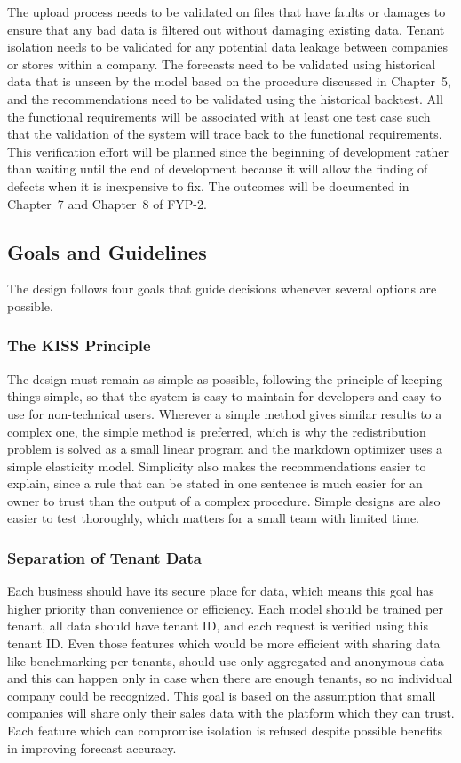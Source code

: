 \documentclass{StockSense}
\begin{document}
The upload process needs to be validated on files that have faults or damages to ensure that any bad data is filtered out without damaging existing data. Tenant isolation needs to be validated for any potential data leakage between companies or stores within a company. The forecasts need to be validated using historical data that is unseen by the model based on the procedure discussed in Chapter~5, and the recommendations need to be validated using the historical backtest. All the functional requirements will be associated with at least one test case such that the validation of the system will trace back to the functional requirements. This verification effort will be planned since the beginning of development rather than waiting until the end of development because it will allow the finding of defects when it is inexpensive to fix. The outcomes will be documented in Chapter~7 and Chapter~8 of FYP-2.

\subsection{Goals and Guidelines}

The design follows four goals that guide decisions whenever several options are possible.

\subsubsection{The KISS Principle}

The design must remain as simple as possible, following the principle of keeping things simple, so that the system is easy to maintain for developers and easy to use for non-technical users. Wherever a simple method gives similar results to a complex one, the simple method is preferred, which is why the redistribution problem is solved as a small linear program and the markdown optimizer uses a simple elasticity model. Simplicity also makes the recommendations easier to explain, since a rule that can be stated in one sentence is much easier for an owner to trust than the output of a complex procedure. Simple designs are also easier to test thoroughly, which matters for a small team with limited time.

\subsubsection{Separation of Tenant Data}

Each business should have its secure place for data, which means this goal has higher priority than convenience or efficiency. Each model should be trained per tenant, all data should have tenant ID, and each request is verified using this tenant ID. Even those features which would be more efficient with sharing data like benchmarking per tenants, should use only aggregated and anonymous data and this can happen only in case when there are enough tenants, so no individual company could be recognized. This goal is based on the assumption that small companies will share only their sales data with the platform which they can trust. Each feature which can compromise isolation is refused despite possible benefits in improving forecast accuracy.
\end{document}
